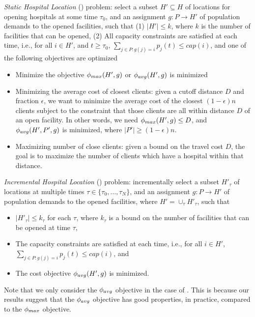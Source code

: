 \noindent
\emph{Static Hospital Location} (\probstatic) problem: select a subset $H' \subseteq H$ of locations 
for opening hospitals at some time $\tau_0$, and an assignment $g: P \rightarrow H'$ of population demands 
to the opened facilities, such that
(1) $|H'|\leq k$, where $k$ is the number of facilities that can be opened,
(2) All capacity constraints are satisfied at each time, i.e., 
for all $i\in H'$, and $t\geq\tau_0$, $\sum_{j\in P: g(j)=i} p_j(t) \leq cap(i)$, and
one of the following objectives are optimized
\begin{itemize}
\item 
Minimize the objective $\phi_{max}(H', g)$ or $\phi_{avg}(H', g)$ is minimized
\item
Minimizing the average cost of closest clients:
given a cutoff distance $D$ and fraction $\epsilon$, we want to minimize the average cost of the 
closest $(1-\epsilon)n$ clients subject to the constraint that those clients are all within 
distance $D$ of an open facility. In other words, we need $\phi_{max}(H', g)\leq D$, and 
$\phi_{avg}(H', P', g)$ is minimized, where $|P'|\geq (1-\epsilon)n$.
\item
Maximizing number of close clients:
given a bound on the travel cost $D$, the goal is to maximize the number of clients which have a 
hospital within that distance.
\end{itemize}



\noindent
\emph{Incremental Hospital Location} (\probinc) problem: incrementally select a subset $H'_{\tau}$ of locations at multiple times
$\tau\in\{\tau_0,\ldots,\tau_N\}$, and an assignment $g:P\rightarrow H'$
of population demands to the opened facilities, where $H'=\cup_{\tau} H'_{\tau}$, such that
\begin{itemize}
\item $|H'_{\tau}|\leq k_{\tau}$ for each $\tau$, where $k_{\tau}$ is a bound on the number 
of facilities that can be opened at time $\tau$,
\item 
The capacity constraints are satisfied at each time, i.e., 
for all $i\in H'$, $\sum_{j \in P: g(j)=i} p_j(t) \leq cap(i)$, and
\item The cost objective $\phi_{avg}(H', g)$ is minimized. 
\end{itemize}

Note that we only consider the $\phi_{avg}$ objective in the case of \probinc{}. This is because
our results suggest that the $\phi_{avg}$ objective has good properties, in practice, compared to the
$\phi_{max}$ objective.


